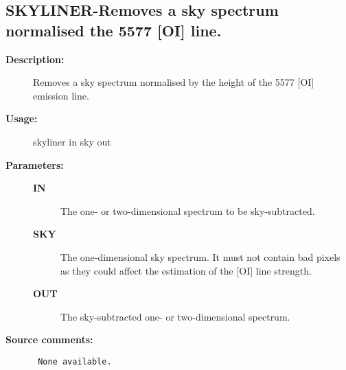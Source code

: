 \subsection{SKYLINER-\label{SKYLINER}Removes a sky spectrum normalised the 5577 [OI] line.}
\begin{description}

\item [{\bf Description:}]
 Removes a sky spectrum normalised by the height of the 5577 [OI]
 emission line.

\item [{\bf Usage:}]
 skyliner in sky out

\item [{\bf Parameters:}]
\begin{description}
\item [{\bf IN}]
 The one- or two-dimensional spectrum to be sky-subtracted.
\item [{\bf SKY}]
 The one-dimensional sky spectrum.  It must not contain bad
 pixels as they could affect the estimation of the [OI] line
 strength.
\item [{\bf OUT}]
 The sky-subtracted one- or two-dimensional spectrum.

\end{description}

\item [{\bf Source comments:}]
\begin{verbatim}
 None available.

\end{verbatim}
\end{description}
